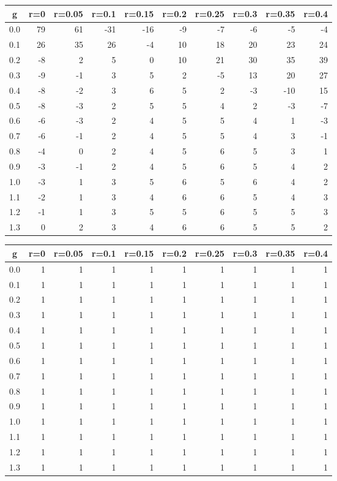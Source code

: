 %
\begin{table}[!tbp]
 \begin{center}
 \begin{tabular}{rrrrrrrrrr}\hline\hline
\multicolumn{1}{c}{g}&\multicolumn{1}{c}{r=0}&\multicolumn{1}{c}{r=0.05}&\multicolumn{1}{c}{r=0.1}&\multicolumn{1}{c}{r=0.15}&\multicolumn{1}{c}{r=0.2}&\multicolumn{1}{c}{r=0.25}&\multicolumn{1}{c}{r=0.3}&\multicolumn{1}{c}{r=0.35}&\multicolumn{1}{c}{r=0.4}\tabularnewline
\hline
0.0&79&61&-31&-16&-9&-7&-6& -5&-4\tabularnewline
0.1&26&35& 26& -4&10&18&20& 23&24\tabularnewline
0.2&-8& 2&  5&  0&10&21&30& 35&39\tabularnewline
0.3&-9&-1&  3&  5& 2&-5&13& 20&27\tabularnewline
0.4&-8&-2&  3&  6& 5& 2&-3&-10&15\tabularnewline
0.5&-8&-3&  2&  5& 5& 4& 2& -3&-7\tabularnewline
0.6&-6&-3&  2&  4& 5& 5& 4&  1&-3\tabularnewline
0.7&-6&-1&  2&  4& 5& 5& 4&  3&-1\tabularnewline
0.8&-4& 0&  2&  4& 5& 6& 5&  3& 1\tabularnewline
0.9&-3&-1&  2&  4& 5& 6& 5&  4& 2\tabularnewline
1.0&-3& 1&  3&  5& 6& 5& 6&  4& 2\tabularnewline
1.1&-2& 1&  3&  4& 6& 6& 5&  4& 3\tabularnewline
1.2&-1& 1&  3&  5& 5& 6& 5&  5& 3\tabularnewline
1.3& 0& 2&  3&  4& 6& 6& 5&  5& 2\tabularnewline
\hline
\end{tabular}

\end{center}

\end{table}

%
\begin{table}[!tbp]
 \begin{center}
 \begin{tabular}{rrrrrrrrrr}\hline\hline
\multicolumn{1}{c}{g}&\multicolumn{1}{c}{r=0}&\multicolumn{1}{c}{r=0.05}&\multicolumn{1}{c}{r=0.1}&\multicolumn{1}{c}{r=0.15}&\multicolumn{1}{c}{r=0.2}&\multicolumn{1}{c}{r=0.25}&\multicolumn{1}{c}{r=0.3}&\multicolumn{1}{c}{r=0.35}&\multicolumn{1}{c}{r=0.4}\tabularnewline
\hline
0.0&1&1&1&1&1&1&1&1&1\tabularnewline
0.1&1&1&1&1&1&1&1&1&1\tabularnewline
0.2&1&1&1&1&1&1&1&1&1\tabularnewline
0.3&1&1&1&1&1&1&1&1&1\tabularnewline
0.4&1&1&1&1&1&1&1&1&1\tabularnewline
0.5&1&1&1&1&1&1&1&1&1\tabularnewline
0.6&1&1&1&1&1&1&1&1&1\tabularnewline
0.7&1&1&1&1&1&1&1&1&1\tabularnewline
0.8&1&1&1&1&1&1&1&1&1\tabularnewline
0.9&1&1&1&1&1&1&1&1&1\tabularnewline
1.0&1&1&1&1&1&1&1&1&1\tabularnewline
1.1&1&1&1&1&1&1&1&1&1\tabularnewline
1.2&1&1&1&1&1&1&1&1&1\tabularnewline
1.3&1&1&1&1&1&1&1&1&1\tabularnewline
\hline
\end{tabular}

\end{center}

\end{table}

